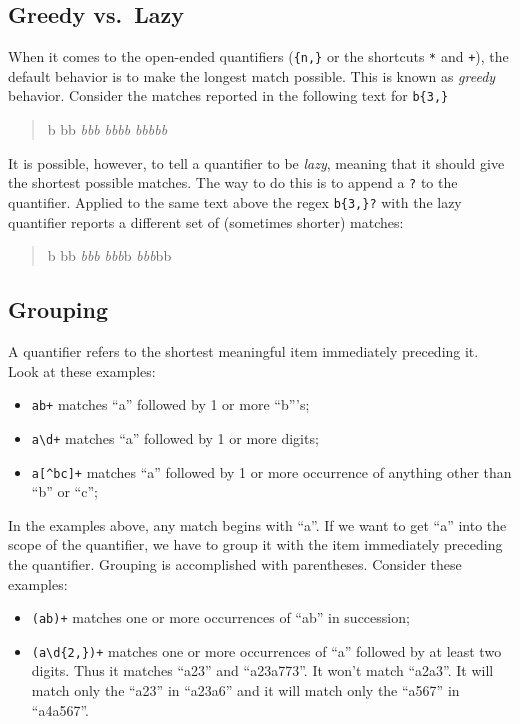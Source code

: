 \documentclass[]{book}
\providecommand{\tightlist}{%
  \setlength{\itemsep}{0pt}\setlength{\parskip}{0pt}}
\theoremstyle{definition}
\theoremstyle{definition}
\theoremstyle{remark}
\begin{document}
{\subsection{Greedy vs.~Lazy}\label{greedy-vs.lazy}

When it comes to the open-ended quantifiers (\texttt{\{n,\}} or the
shortcuts \texttt{*} and \texttt{+}), the default behavior is to make
the longest match possible. This is known as \emph{greedy}
 behavior. Consider the matches reported in the following
text for \texttt{b\{3,\}}

\begin{quote}
b bb \emph{bbb} \emph{bbbb} \emph{bbbbb}
\end{quote}

It is possible, however, to tell a quantifier to be \emph{lazy},
 meaning that it should give the shortest possible matches.
The way to do this is to append a \texttt{?} to the quantifier. Applied
to the same text above the regex \texttt{b\{3,\}?} with the lazy
quantifier reports a different set of (sometimes shorter) matches:

\begin{quote}
b bb \emph{bbb} \emph{bbb}b \emph{bbb}bb
\end{quote}

\subsection{Grouping}\label{grouping}

 A quantifier refers to the shortest meaningful item
immediately preceding it. Look at these examples:

\begin{itemize}
\tightlist
\item
  \texttt{ab+} matches ``a'' followed by 1 or more ``b'''s;
\item
  \texttt{a\textbackslash{}d+} matches ``a'' followed by 1 or more
  digits;
\item
  \texttt{a{[}\^{}bc{]}+} matches ``a'' followed by 1 or more occurrence
  of anything other than ``b'' or ``c'';
\end{itemize}

In the examples above, any match begins with ``a''. If we want to get
``a'' into the scope of the quantifier, we have to group it with the
item immediately preceding the quantifier. Grouping is accomplished with
parentheses. Consider these examples:

\begin{itemize}
\tightlist
\item
  \texttt{(ab)+} matches one or more occurrences of ``ab'' in
  succession;
\item
  \texttt{(a\textbackslash{}d\{2,\})+} matches one or more occurrences
  of ``a'' followed by at least two digits. Thus it matches ``a23'' and
  ``a23a773''. It won't match ``a2a3''. It will match only the ``a23''
  in ``a23a6'' and it will match only the ``a567'' in ``a4a567''.
\end{itemize}

}
\end{document}
